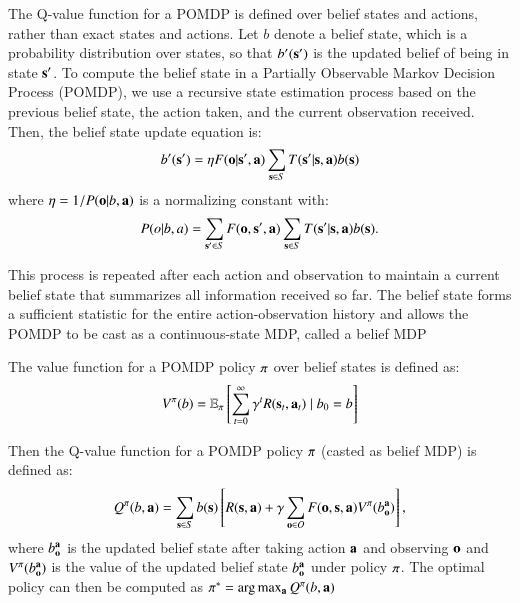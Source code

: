 The Q-value function for a POMDP is defined over belief states and actions, rather than exact states and actions. Let $b$ denote a belief state, which is a probability distribution over states, so that $b'(\mathbf{s}')$ is the updated belief of being in state $\mathbf{s}'$. To compute the belief state in a Partially Observable Markov Decision Process (POMDP), we use a recursive state estimation process based on the previous belief state, the action taken, and the current observation received. Then, the belief state update equation is: 
\begin{equation}
    b'(\mathbf{s}')=\eta {F}(\mathbf{o} | \mathbf{s}',\mathbf{a})\sum_{\mathbf{s} \in S}T(\mathbf{s}'| \mathbf{s}, \mathbf{a}) b(\mathbf{s})
\end{equation}
\noindent where $\eta = 1/P(\mathbf{o}|b,\mathbf{a})$ is a normalizing constant with:
\begin{equation}
    P(o|b,a) = \sum_{\mathbf{s}' \in S} {F}(\mathbf{o}, \mathbf{s}',\mathbf{a}) \sum_{\mathbf{s} \in S} T(\mathbf{s}'|\mathbf{s},\mathbf{a}) b(\mathbf{s}).
\end{equation}

This process is repeated after each action and observation to maintain a current belief state that summarizes all information received so far. The belief state forms a sufficient statistic for the entire action-observation history and allows the POMDP to be cast as a continuous-state MDP, called a belief MDP

The value function for a POMDP policy $\pi$ over belief states is defined as: \begin{equation}
V^\pi(b) = \mathbb{E}_\pi\left[\sum_{t=0}^\infty \gamma^t R(\mathbf{s}_t,\mathbf{a}_t) \mid b_0 = b\right]
\end{equation} 

Then the Q-value function for a POMDP policy $\pi$ (casted as belief MDP) is defined as:
\begin{equation}
Q^{\pi}(b,\mathbf{a}) = \sum_{\mathbf{s} \in S} b(\mathbf{s}) \left[R(\mathbf{s},\mathbf{a}) + \gamma \sum_{\mathbf{o} \in O} {F}(\mathbf{o}, \mathbf{s},\mathbf{a}) V^{\pi}(b^{\mathbf{a}}_{\mathbf{o}}) \right],
\end{equation}
\noindent where $b^{\mathbf{a}}_{\mathbf{o}}$ is the updated belief state after taking action $\mathbf{a}$ and observing $\mathbf{o}$ and $V^{\pi}(b^{\mathbf{a}}_{\mathbf{o}})$ is the value of the updated belief state $b^{\mathbf{a}}_{\mathbf{o}}$ under policy $\pi$. The optimal policy can then be computed as $\pi^* = \arg \max_{\mathbf{a}} Q^{\pi}(b,\mathbf{a})$

